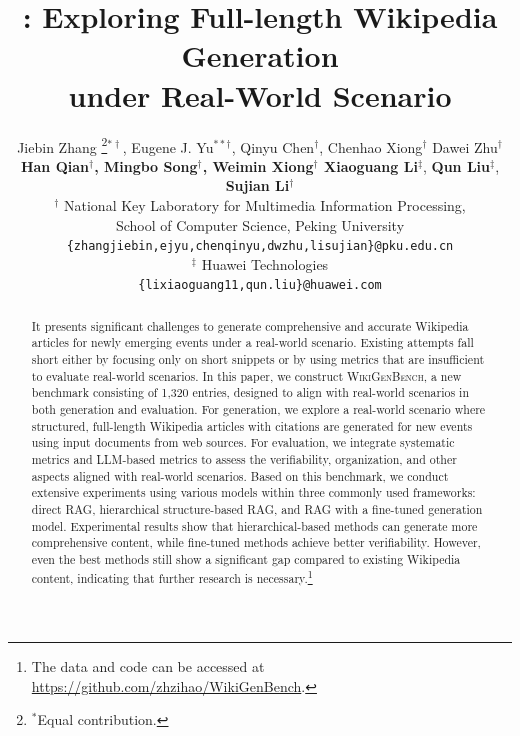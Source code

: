 \documentclass[11pt]{article}
\title{\bench{}: Exploring  Full-length Wikipedia Generation \\under Real-World Scenario}
\author{Jiebin Zhang \thanks{$^*$Equal contribution. }$^{*\dag}$, Eugene J. Yu{$^{**\dag}$}, Qinyu Chen{$^\dag$}, 
Chenhao Xiong$^\dag$ Dawei Zhu$^\dag$\\
\textbf{
Han Qian$^\dag$,
Mingbo Song$^\dag$, Weimin Xiong$^\dag$
Xiaoguang Li$^\ddag$}, \textbf{Qun Liu$^\ddag$}, \textbf{Sujian Li$^\dag$} \\
  $^\dag$ National Key Laboratory for Multimedia Information Processing, \\School of Computer Science, Peking University \\
  \texttt{\{zhangjiebin,ejyu,chenqinyu,dwzhu,lisujian\}@pku.edu.cn} \\
  $^\ddag$ Huawei Technologies\\
  \texttt{\{lixiaoguang11,qun.liu\}@huawei.com} 
  }
\newcommand{\bench}{\textsc{WikiGenBench}}
\begin{document}
\maketitle

\begin{abstract}
It presents significant challenges to generate comprehensive and accurate Wikipedia articles for newly emerging events under a real-world scenario. 
Existing attempts fall short either by focusing only on short snippets or by using metrics that are insufficient to evaluate real-world scenarios.
In this paper, we construct \bench{}, a new benchmark consisting of 1,320 entries, designed to align with real-world scenarios in both generation and evaluation. For generation, we explore a real-world scenario where structured, full-length Wikipedia articles with citations are generated for new events using input documents from web sources.  For evaluation, we integrate systematic metrics and LLM-based metrics to assess the verifiability, organization, and other aspects aligned with real-world scenarios. Based on this benchmark, we conduct extensive experiments using various models within three commonly used frameworks: direct RAG, hierarchical structure-based RAG, and RAG with a fine-tuned generation model.  Experimental results show that hierarchical-based methods can generate more comprehensive content, while fine-tuned methods achieve better verifiability. However, even the best methods still show a significant gap compared to existing Wikipedia content, indicating that further research is necessary.\footnote{The data and code can be accessed at \url{https://github.com/zhzihao/WikiGenBench}.}
\end{abstract}
\end{document}

